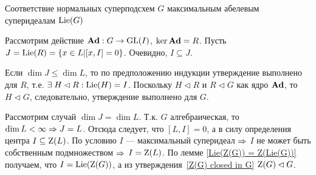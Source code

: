 \begin{subsection}{Соответствие нормальных суперподсхем $ G $
                   максимальным абелевым суперидеалам $ \mathrm{Lie}(G) $ }
\begin{theorem}
{      Рассмотрим действие $ \mathbf{Ad}: G \to \mathrm{GL}(I) $, $ \ker \mathbf{Ad} = R $.
      Пусть $ J = \mathrm{Lie}(R) = \{ x \in L | [x, I] = 0 \} $.
      Очевидно, $ I \subseteq J $.

      Если $ \dim J \leqslant \dim L $, то по предположению индукции утверждение выполнено для $ R $,
      т.е. $ \exists \; H \lhd R : \mathrm{Lie}(H) = I $. Поскольку $ H \lhd R $
      и $ R \lhd G $ как ядро $ \mathbf{Ad} $, то $ H \lhd G $, следовательно, утверждение выполнено для $ G $.

      Рассмотрим случай $ \dim J = \dim L $.
      Т.к. $ G $ алгебраическая, то $ \dim L < \infty \Rightarrow J = L $.
      Отсюда следует, что $ [L, I] = 0 $, а в силу определения центра $ I \subseteq \mathrm{Z}(L) $.
      По условию $ I $ --- максимальный суперидеал $ \Rightarrow $ $ I $ не может быть
      собственным подмножеством $ \Rightarrow $ $ I = \mathrm{Z}(L) $.
      По лемме \ref{Lie(Z(G)) = Z(Lie(G))} получаем, что $ I = \mathrm{Lie}(\mathrm{Z}(G)) $, а
      из утверждения~\ref{Z(G) closed in G} $ \mathrm{Z}(G) \lhd G $.
    \qedhere
    }
  \end{theorem}

\end{subsection}
